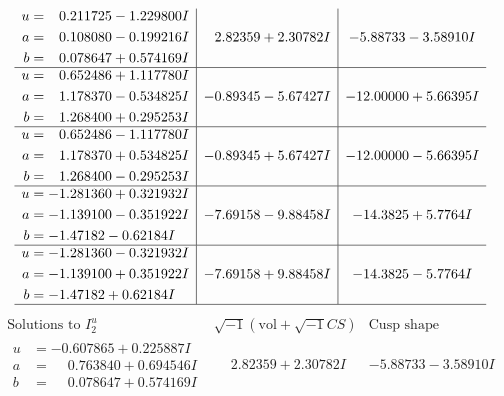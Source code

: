 \documentclass[1p]{elsarticle_modified}
\theoremstyle{definition}
\newcommand{\I}{\sqrt{-1}}
\begin{document}
$$\begin{array}{c|c|c}
\begin{aligned}
u &= \phantom{-}0.211725 - 1.229800 I \\
a &= \phantom{-}0.108080 - 0.199216 I \\
b &= \phantom{-}0.078647 + 0.574169 I\end{aligned}
 & \phantom{-}2.82359 + 2.30782 I & -5.88733 - 3.58910 I \\ \hline\begin{aligned}
u &= \phantom{-}0.652486 + 1.117780 I \\
a &= \phantom{-}1.178370 - 0.534825 I \\
b &= \phantom{-}1.268400 + 0.295253 I\end{aligned}
 & -0.89345 - 5.67427 I & -12.00000 + 5.66395 I \\ \hline\begin{aligned}
u &= \phantom{-}0.652486 - 1.117780 I \\
a &= \phantom{-}1.178370 + 0.534825 I \\
b &= \phantom{-}1.268400 - 0.295253 I\end{aligned}
 & -0.89345 + 5.67427 I & -12.00000 - 5.66395 I \\ \hline\begin{aligned}
u &= -1.281360 + 0.321932 I \\
a &= -1.139100 - 0.351922 I \\
b &= -1.47182 - 0.62184 I\end{aligned}
 & -7.69158 - 9.88458 I & -14.3825 + 5.7764 I \\ \hline\begin{aligned}
u &= -1.281360 - 0.321932 I \\
a &= -1.139100 + 0.351922 I \\
b &= -1.47182 + 0.62184 I\end{aligned}
 & -7.69158 + 9.88458 I & -14.3825 - 5.7764 I\\
 \hline 
 \end{array}$$\newpage$$\begin{array}{c|c|c}  
\text{Solutions to }I^u_{2}& \I (\text{vol} + \sqrt{-1}CS) & \text{Cusp shape}\\
 \hline 
\begin{aligned}
u &= -0.607865 + 0.225887 I \\
a &= \phantom{-}0.763840 + 0.694546 I \\
b &= \phantom{-}0.078647 + 0.574169 I\end{aligned}
 & \phantom{-}2.82359 + 2.30782 I & -5.88733 - 3.58910 I \\ \hline\begin{aligned}

\end{aligned}
\end{array}$$
\end{document}
